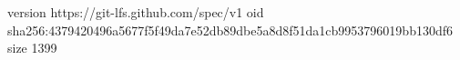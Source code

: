 version https://git-lfs.github.com/spec/v1
oid sha256:4379420496a5677f5f49da7e52db89dbe5a8d8f51da1cb9953796019bb130df6
size 1399
